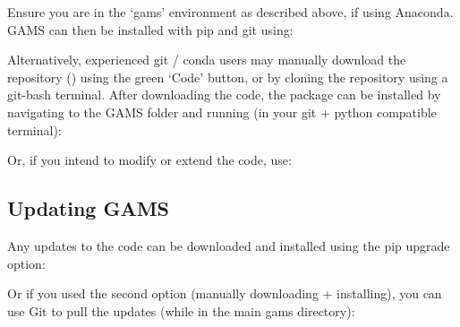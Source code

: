 \documentclass[letterpaper,10pt,english,openany,oneside]{sphinxmanual}
\begin{document}
Ensure you are in the ‘gams’ environment as described above, if using Anaconda. GAMS can then be installed with pip and git using:

\begin{sphinxVerbatim}[commandchars=\\\{\}]
  
\end{sphinxVerbatim}

Alternatively, experienced git / conda users may manually download the repository () using the green ‘Code’ button, or by cloning the repository using a git-bash terminal. After downloading the code, the package can be installed by navigating to the GAMS folder and running (in your git + python compatible terminal):

\begin{sphinxVerbatim}[commandchars=\\\{\}]
  
\end{sphinxVerbatim}

Or, if you intend to modify or extend the code, use:

\begin{sphinxVerbatim}[commandchars=\\\{\}]
  
\end{sphinxVerbatim}


\subsection{Updating GAMS}
\label{\detokenize{content/getting_started/installation:updating-gams}}
Any updates to the code can be downloaded and installed using the pip upgrade option:

\begin{sphinxVerbatim}[commandchars=\\\{\}]
   
\end{sphinxVerbatim}

Or if you used the second option (manually downloading + installing), you can use Git to pull the updates (while in the main gams directory):
\end{document}
